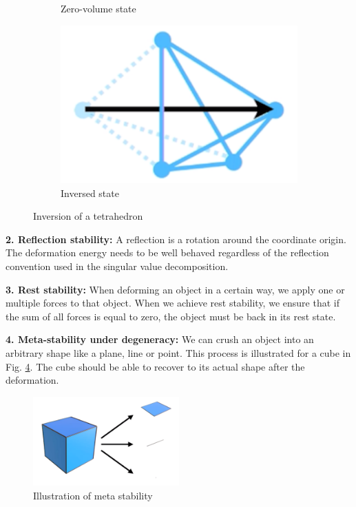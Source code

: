 \begin{figure}[!ht]
\begin{subfigure}{.3\textwidth}
  \caption{Zero-volume state}
  \label{fig:inversion_2}
\end{subfigure}
\begin{subfigure}{.3\textwidth}
  \centering
  \includegraphics[width=.8\linewidth]{resources/inversion_3}  
  \caption{Inversed state}
  \label{fig:inversion_3}
\end{subfigure}
\caption[Inversion of a tetrahedron]{Inversion of a tetrahedron {\cite{STREAM2018}}}
\label{fig:inversion}
\end{figure}


\textbf{2. Reflection stability:} A reflection is a rotation around the coordinate origin. The deformation energy needs to be well behaved regardless of the reflection convention used in the singular value decomposition.

\textbf{3. Rest stability:} When deforming an object in a certain way, we apply one or multiple forces to that object. When we achieve rest stability, we ensure that if the sum of all forces is equal to zero, the object must be back in its rest state.

\textbf{4. Meta-stability under degeneracy:} We can crush an object into an arbitrary shape like a plane, line or point. This process is illustrated for a cube in Fig. \ref{fig:meta_stability}. The cube should be able to recover to its actual shape after the deformation.

\begin{figure}[!htbp]
	\centering
	\includegraphics[width=0.5\textwidth]{resources/meta_stability}
	\caption[Illustration of meta stability]{Illustration of meta stability {\cite{STREAM2018}}}
	\label{fig:meta_stability}
\end{figure}


